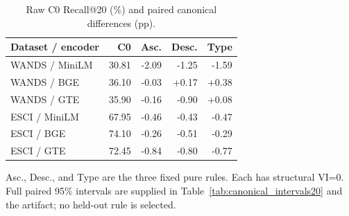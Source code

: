 \begin{table}[t]
\centering
\small
\setlength{\tabcolsep}{4pt}
\caption{Raw C0 Recall@20 (\%) and paired canonical differences (pp).}
\label{tab:canonical_top20}
\begin{tabular}{lrrrr}
\toprule
Dataset / encoder & C0 & Asc. & Desc. & Type \\
\midrule
WANDS / MiniLM & 30.81 & -2.09 & -1.25 & -1.59 \\
WANDS / BGE & 36.10 & -0.03 & +0.17 & +0.38 \\
WANDS / GTE & 35.90 & -0.16 & -0.90 & +0.08 \\
ESCI / MiniLM & 67.95 & -0.46 & -0.43 & -0.47 \\
ESCI / BGE & 74.10 & -0.26 & -0.51 & -0.29 \\
ESCI / GTE & 72.45 & -0.84 & -0.80 & -0.77 \\
\bottomrule
\end{tabular}
\par\smallskip\begin{minipage}{\linewidth}\small Asc., Desc., and Type are the three fixed pure rules. Each has structural VI=0. Full paired 95\% intervals are supplied in Table~\ref{tab:canonical_intervals20} and the artifact; no held-out rule is selected.\end{minipage}
\end{table}
